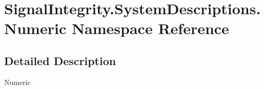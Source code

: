 \hypertarget{namespaceSignalIntegrity_1_1SystemDescriptions_1_1Numeric}{}\section{Signal\+Integrity.\+System\+Descriptions.\+Numeric Namespace Reference}
\label{namespaceSignalIntegrity_1_1SystemDescriptions_1_1Numeric}


\subsection{Detailed Description}
\begin{DoxyVerb}Numeric\end{DoxyVerb}
 